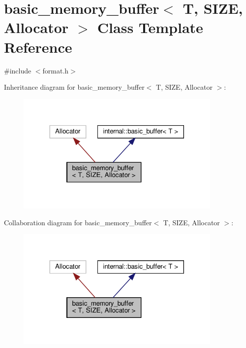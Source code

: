 \hypertarget{classbasic__memory__buffer}{}\section{basic\+\_\+memory\+\_\+buffer$<$ T, S\+I\+ZE, Allocator $>$ Class Template Reference}
\label{classbasic__memory__buffer}


{\ttfamily \#include $<$format.\+h$>$}



Inheritance diagram for basic\+\_\+memory\+\_\+buffer$<$ T, S\+I\+ZE, Allocator $>$\+:
\nopagebreak
\begin{figure}[H]
\begin{center}
\leavevmode
\includegraphics[width=284pt]{classbasic__memory__buffer__inherit__graph}
\end{center}
\end{figure}


Collaboration diagram for basic\+\_\+memory\+\_\+buffer$<$ T, S\+I\+ZE, Allocator $>$\+:
\nopagebreak
\begin{figure}[H]
\begin{center}
\leavevmode
\includegraphics[width=284pt]{classbasic__memory__buffer__coll__graph}
\end{center}
\end{figure}
